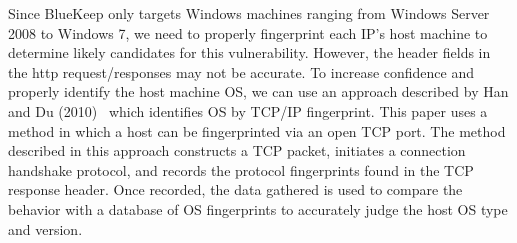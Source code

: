 Since BlueKeep only targets Windows machines ranging from Windows Server 2008 to Windows 7, we need to properly fingerprint each IP's host machine to determine likely candidates for this vulnerability. However, the header fields in the http request/responses may not be accurate. To increase confidence and properly identify the host machine OS, we can use an approach described by Han and Du (2010)~\cite{han_du_2010} which identifies OS by TCP/IP fingerprint. This paper uses a method in which a host can be fingerprinted via an open TCP port. The method described in this approach constructs a TCP packet, initiates a connection handshake protocol, and records the protocol fingerprints found in the TCP response header. Once recorded, the data gathered is used to compare the behavior with a database of OS fingerprints to accurately judge the host OS type and version.